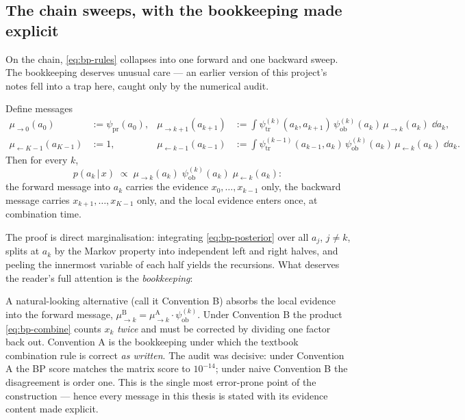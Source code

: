 \subsection{The chain sweeps, with the bookkeeping made explicit}

On the chain, \eqref{eq:bp-rules} collapses into one forward and one
backward sweep. The bookkeeping deserves unusual care --- an earlier
version of this project's notes fell into a trap here, caught only by the
numerical audit.

\begin{proposition}[Convention A]\label{prop:bp-convA}
Define messages
\begin{align}
  \mu_{\to 0}(a_0) &:= \psi_{\mathrm{pr}}(a_0),
  &
  \mu_{\to k+1}(a_{k+1}) &:= \int
    \psi^{(k)}_{\mathrm{tr}}(a_k, a_{k+1})\,
    \psi^{(k)}_{\mathrm{ob}}(a_k)\,
    \mu_{\to k}(a_k)\; \dd a_k ,
  \label{eq:bp-fwd}\\
  \mu_{\leftarrow K-1}(a_{K-1}) &:= 1,
  &
  \mu_{\leftarrow k-1}(a_{k-1}) &:= \int
    \psi^{(k-1)}_{\mathrm{tr}}(a_{k-1}, a_k)\,
    \psi^{(k)}_{\mathrm{ob}}(a_k)\,
    \mu_{\leftarrow k}(a_k)\; \dd a_k .
  \label{eq:bp-bwd}
\end{align}
Then for every $k$,
\begin{equation}
  p(a_k \,|\, x) \;\propto\;
  \mu_{\to k}(a_k)\;
  \psi^{(k)}_{\mathrm{ob}}(a_k)\;
  \mu_{\leftarrow k}(a_k) :
  \label{eq:bp-combine}
\end{equation}
the forward message into $a_k$ carries the evidence $x_0, \dots, x_{k-1}$
only, the backward message carries $x_{k+1}, \dots, x_{K-1}$ only, and the
local evidence enters once, at combination time.
\end{proposition}

The proof is direct marginalisation: integrating \eqref{eq:bp-posterior}
over all $a_j$, $j \neq k$, splits at $a_k$ by the Markov property into
independent left and right halves, and peeling the innermost variable of
each half yields the recursions. What deserves the reader's full attention
is the \emph{bookkeeping}:

\begin{remark}\label{rmk:bp-trap}
A natural-looking alternative (call it Convention B) absorbs the local
evidence into the forward message,
$\mu^{\mathrm{B}}_{\to k} = \mu^{\mathrm{A}}_{\to k} \cdot
\psi^{(k)}_{\mathrm{ob}}$. Under Convention B the product
\eqref{eq:bp-combine} counts $x_k$ \emph{twice} and must be corrected by
dividing one factor back out. Convention A is the bookkeeping under which
the textbook combination rule is correct \emph{as written}. The audit was
decisive: under Convention A the BP score matches the matrix score to
$10^{-14}$; under naive Convention B the disagreement is order one. This
is the single most error-prone point of the construction --- hence every
message in this thesis is stated with its evidence content made explicit.
\end{remark}

